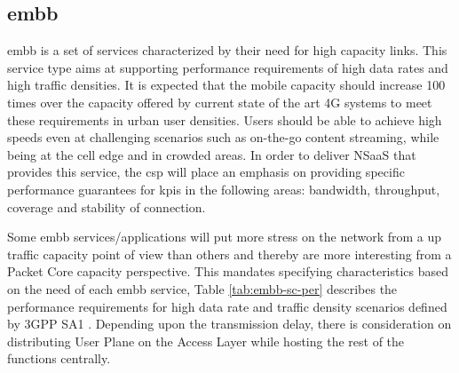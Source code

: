     \subsection{\acrfull{embb}}
    
    \acrshort{embb} is a set of services characterized by their need for high capacity links. This service type aims at supporting performance requirements of high data rates and high traffic densities. It is expected that the mobile capacity should increase 100 times over the capacity offered by current state of the art 4G systems to meet these requirements in urban user densities. Users should be able to achieve high speeds even at challenging scenarios such as on-the-go content streaming, while being at the cell edge and in crowded areas. In order to deliver NSaaS that provides this service, the \acrshort{csp} will place an emphasis on providing specific performance guarantees for \acrshort{kpi}s in the following areas: bandwidth, throughput, coverage and stability of connection.
    
    Some \acrshort{embb} services/applications will put more stress on the network from a \acrfull{up} traffic capacity point of view than others and thereby are more interesting from a Packet Core capacity perspective. This mandates specifying characteristics based on the need of each \acrshort{embb} service, Table \ref{tab:embb-sc-per} \cite{3GPP_TS_22.261} describes the performance requirements for high data rate and traffic density scenarios defined by 3GPP SA1 \cite{rel-15}.
    Depending upon the transmission delay, there is consideration on distributing User Plane on the Access Layer while hosting the rest of the functions centrally.

